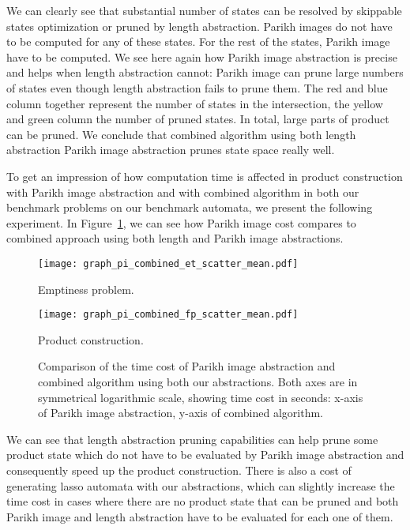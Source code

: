 We can clearly see that substantial number of states can be resolved by skippable states optimization or pruned by length abstraction. Parikh images do not have to be computed for any of these states. For the rest of the states, Parikh image have to be computed. We see here again how Parikh image abstraction is precise and helps when length abstraction cannot: Parikh image can prune large numbers of states even though length abstraction fails to prune them. The red and blue column together represent the number of states in the intersection, the yellow and green column the number of pruned states. In total, large parts of product can be pruned. We conclude that combined algorithm using both length abstraction Parikh image abstraction prunes state space really well.

To get an impression of how computation time is affected in product construction with Parikh image abstraction and with combined algorithm in both our benchmark problems on our benchmark automata, we present the following experiment. In Figure~\ref{fig:graph:pi_comb_time_cost_comp}, we can see how Parikh image cost compares to combined approach using both length and Parikh image abstractions.
\begin{figure}[ht]
    \centering
    \begin{minipage}{0.49\linewidth}
        \centering
        \texttt{[image: graph\_pi\_combined\_et\_scatter\_mean.pdf]}
        \caption{Emptiness problem.}
        \label{fig:graph:et_pi_comb_time_difference}
    \end{minipage}
    \hfill
    \begin{minipage}{0.49\linewidth}
        \centering
        \texttt{[image: graph\_pi\_combined\_fp\_scatter\_mean.pdf]}
        \caption{Product construction.}
        \label{fig:graph:fp_pi_comb_time_difference}
    \end{minipage}
    \vspace{0.5cm}
    \caption{Comparison of the time cost of Parikh image abstraction and combined algorithm using both our abstractions. Both axes are in symmetrical logarithmic scale, showing time cost in seconds: x-axis of Parikh image abstraction, y-axis of combined algorithm.}
    \label{fig:graph:pi_comb_time_cost_comp}
\end{figure}

We can see that length abstraction pruning capabilities can help prune some product state which do not have to be evaluated by Parikh image abstraction and consequently speed up the product construction. There is also a cost of generating lasso automata with our abstractions, which can slightly increase the time cost in cases where there are no product state that can be pruned and both Parikh image and length abstraction have to be evaluated for each one of them.

